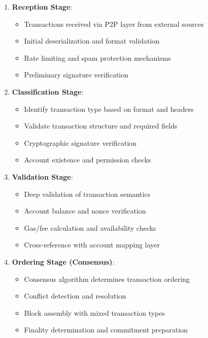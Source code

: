 \documentclass[11pt,a4paper]{article}
\begin{document}
\begin{enumerate}
    \item \textbf{Reception Stage}: 
    \begin{itemize}
        \item Transactions received via P2P layer from external sources
        \item Initial deserialization and format validation
        \item Rate limiting and spam protection mechanisms
        \item Preliminary signature verification
    \end{itemize}
    
    \item \textbf{Classification Stage}: 
    \begin{itemize}
        \item Identify transaction type based on format and headers
        \item Validate transaction structure and required fields
        \item Cryptographic signature verification
        \item Account existence and permission checks
    \end{itemize}
    
    \item \textbf{Validation Stage}: 
    \begin{itemize}
        \item Deep validation of transaction semantics
        \item Account balance and nonce verification
        \item Gas/fee calculation and availability checks
        \item Cross-reference with account mapping layer
    \end{itemize}
    
    \item \textbf{Ordering Stage (Consensus)}: 
    \begin{itemize}
        \item Consensus algorithm determines transaction ordering
        \item Conflict detection and resolution
        \item Block assembly with mixed transaction types
        \item Finality determination and commitment preparation
    \end{itemize}
    

\end{enumerate}
\end{document}
